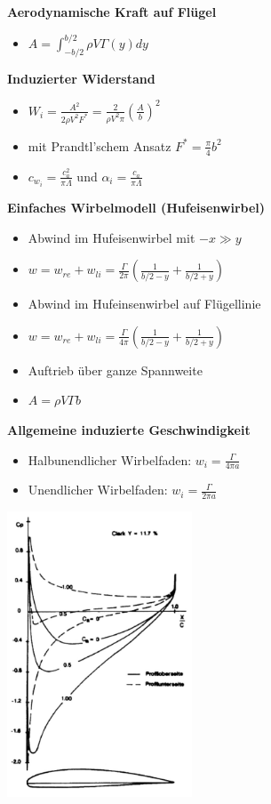 \documentclass[8pt, landscape, fleqn]{scrartcl}
\begin{document}
\begin{multicols*}{3}
\textbf{Aerodynamische Kraft auf Flügel}

\begin{itemize}
    \item $A = \int_{-b/2}^{b/2} \rho V \Gamma(y) dy$
\end{itemize}

\textbf{Induzierter Widerstand}




\begin{itemize} 
    \item $W_i = \frac{A^2}{2\rho V^2F^*} = \frac{2}{\rho V^2 \pi}\left(\frac{A}{b}\right)^2$
    \item mit Prandtl'schem Ansatz $F^* = \frac{\pi}{4}b^2$
    \item $c_{w_i} = \frac{c_a^2}{\pi \Lambda}$ und $\alpha_i = \frac{c_a}{\pi \Lambda}$
\end{itemize}

\textbf{Einfaches Wirbelmodell (Hufeisenwirbel)}

\begin{itemize}
    \item Abwind im Hufeisenwirbel mit $-x \gg y$
    \item $w = w_{re}+ w_{li} = \frac{\Gamma}{2\pi}\left(\frac{1}{b/2-y}+\frac{1}{b/2+y}\right)$
    \item Abwind im Hufeinsenwirbel auf Flügellinie
    \item $w = w_{re}+ w_{li} = \frac{\Gamma}{4\pi}\left(\frac{1}{b/2-y}+\frac{1}{b/2+y}\right)$
    \item Auftrieb über ganze Spannweite
    \item $A = \rho V \Gamma b$
\end{itemize}
\textbf{Allgemeine induzierte Geschwindigkeit}
\begin{itemize}
    \item Halbunendlicher Wirbelfaden: $w_i = \frac{\Gamma}{4\pi a}$
    \item Unendlicher Wirbelfaden: $w_i = \frac{\Gamma}{2\pi a}$
\end{itemize}

\begin{center}
    \includegraphics[width = 5.5cm]{Druckverteilung_am_Profil.png}
\end{center}



\end{multicols*}
\end{document}
